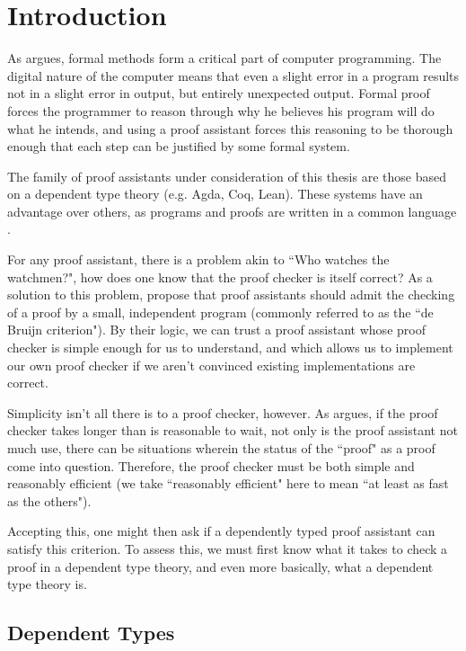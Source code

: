 \section{Introduction}

As \citet{Dijkstra1988} argues, formal methods form a critical part of computer programming.
The digital nature of the computer means that even a slight error in a program results not in a slight error in output, but entirely unexpected output.
Formal proof forces the programmer to reason through why he believes his program will do what he intends, and using a proof assistant forces this reasoning to be thorough enough that each step can be justified by some formal system.

The family of proof assistants under consideration of this thesis are those based on a dependent type theory (e.g. Agda, Coq, Lean).
These systems have an advantage over others, as programs and proofs are written in a common language \citep{Nordstrom1990}.

For any proof assistant, there is a problem akin to ``Who watches the watchmen?", how does one know that the proof checker is itself correct?
As a solution to this problem, \citet{Barendregt2005} propose that proof assistants should admit the checking of a proof by a small, independent program (commonly referred to as the ``de Bruijn criterion").
By their logic, we can trust a proof assistant whose proof checker is simple enough for us to understand, and which allows us to implement our own proof checker if we aren't convinced existing implementations are correct.

Simplicity isn't all there is to a proof checker, however.
As \citet{Geuvers2008} argues, if the proof checker takes longer than is reasonable to wait, not only is the proof assistant not much use, there can be situations wherein the status of the ``proof" as a proof come into question.
Therefore, the proof checker must be both simple and reasonably efficient (we take ``reasonably efficient" here to mean ``at least as fast as the others").

Accepting this, one might then ask if a dependently typed proof assistant can satisfy this criterion.
To assess this, we must first know what it takes to check a proof in a dependent type theory, and even more basically, what a dependent type theory is.

\subsection{Dependent Types}
\label{sec:dependent-types}

